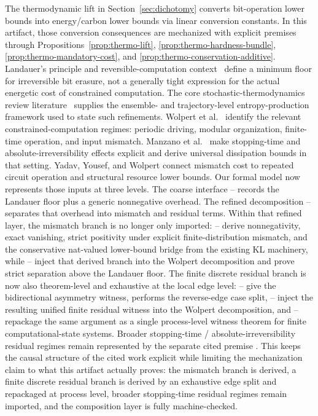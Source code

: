 The thermodynamic lift in Section~\ref{sec:dichotomy} converts bit-operation lower bounds into energy/carbon lower bounds via linear conversion constants. In this artifact, those conversion consequences are mechanized with explicit premises through Propositions~\ref{prop:thermo-lift}, \ref{prop:thermo-hardness-bundle}, \ref{prop:thermo-mandatory-cost}, and \ref{prop:thermo-conservation-additive}. Landauer's principle and reversible-computation context~\cite{landauer1961irreversibility,bennett2003notes} define a minimum floor for irreversible bit erasure, not a generally tight expression for the actual energetic cost of constrained computation. The core stochastic-thermodynamics review literature~\cite{vandenbroeck2015ensemble} supplies the ensemble- and trajectory-level entropy-production framework used to state such refinements. Wolpert et al.\ \cite{wolpert2024stochastic} identify the relevant constrained-computation regimes: periodic driving, modular organization, finite-time operation, and input mismatch. Manzano et al.\ \cite{manzano2024absolute} make stopping-time and absolute-irreversibility effects explicit and derive universal dissipation bounds in that setting. Yadav, Yousef, and Wolpert \cite{yadav2026minimal} connect mismatch cost to repeated circuit operation and structural resource lower bounds. Our formal model now represents those inputs at three levels. The coarse interface -- records the Landauer floor plus a generic nonnegative overhead. The refined decomposition -- separates that overhead into mismatch and residual terms. Within that refined layer, the mismatch branch is no longer only imported: -- derive nonnegativity, exact vanishing, strict positivity under explicit finite-distribution mismatch, and the conservative nat-valued lower-bound bridge from the existing KL machinery, while -- inject that derived branch into the Wolpert decomposition and prove strict separation above the Landauer floor. The finite discrete residual branch is now also theorem-level and exhaustive at the local edge level: -- give the bidirectional asymmetry witness,  performs the reverse-edge case split, -- inject the resulting unified finite residual witness into the Wolpert decomposition, and -- repackage the same argument as a single process-level witness theorem for finite computational-state systems. Broader stopping-time / absolute-irreversibility residual regimes remain represented by the separate cited premise . This keeps the causal structure of the cited work explicit while limiting the mechanization claim to what this artifact actually proves: the mismatch branch is derived, a finite discrete residual branch is derived by an exhaustive edge split and repackaged at process level, broader stopping-time residual regimes remain imported, and the composition layer is fully machine-checked.

